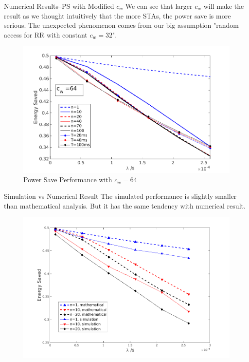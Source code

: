 \documentclass[10pt]{beamer}
\begin{document}
\begin{frame}{Numerical Results--PS with Modified $c_w$}
We can see that larger $c_w$ will make the result as we thought intuitively that the more STAs, the power save is more serious.
The unexpected phenomenon comes from our big assumption "random access for RR with constant $c_w=32$".
\begin{figure}
\includegraphics[scale=0.36]{./figure/test_per_3.png}
\caption{Power Save Performance with $c_w=64$}
\label{fig_PS_2}
\end{figure}
\end{frame}

\begin{frame}{Simulation vs Numerical Result}
The simulated performance is slightly smaller than mathematical analysis. 
But it has the same tendency with numerical result. 
\begin{figure}
\includegraphics[scale=0.4]{./figure/test_per_compare.png}
\end{figure}
\end{frame}
\end{document}
